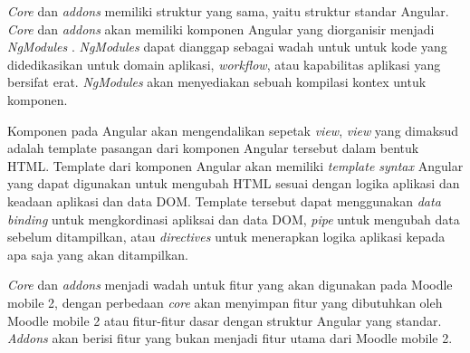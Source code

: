 \textit{Core} dan \textit{addons} memiliki struktur yang sama, yaitu struktur standar Angular. \textit{Core} dan \textit{addons} akan memiliki komponen Angular yang diorganisir menjadi \textit{NgModules}\cite{angular:architecture}
. \textit{NgModules} dapat dianggap sebagai wadah untuk untuk kode yang didedikasikan untuk domain aplikasi, \textit{workflow}, atau kapabilitas aplikasi yang bersifat erat. \textit{NgModules} akan menyediakan sebuah kompilasi kontex untuk komponen. \cite{angular:architecture:modules}

Komponen pada Angular akan mengendalikan sepetak \textit{view}, \textit{view} yang dimaksud adalah template pasangan dari komponen Angular tersebut dalam bentuk HTML. Template dari komponen Angular akan memiliki \textit{template syntax} Angular yang dapat digunakan untuk mengubah HTML sesuai dengan logika aplikasi dan keadaan aplikasi dan data DOM. Template tersebut dapat menggunakan \textit{data binding} untuk mengkordinasi apliksai dan data DOM, \textit{pipe} untuk mengubah data sebelum ditampilkan, atau \textit{directives} untuk menerapkan logika aplikasi kepada apa saja yang akan ditampilkan. \cite{angular:architecture:components}

\textit{Core} dan \textit{addons} menjadi wadah untuk fitur yang akan digunakan pada Moodle mobile 2, dengan perbedaan \textit{core} akan menyimpan fitur yang dibutuhkan oleh Moodle mobile 2 atau fitur-fitur dasar dengan struktur Angular yang standar. \textit{Addons} akan berisi fitur yang bukan menjadi fitur utama dari Moodle mobile 2. \cite{moodle:dev}

